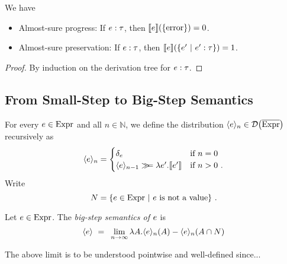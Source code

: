 %
%
\begin{theorem}
	\label{thm:small-step-progress-preservation} We have 
	\begin{itemize}
		\item Almost-sure progress: If $e : \tau$, then $\llbracket e \rrbracket(\{ \textnormal{error} \}) = 0$.
		\item Almost-sure preservation: If $e : \tau$, then $\llbracket e \rrbracket(\{ e' ~|~ e' : \tau \}) = 1$.
	\end{itemize}
	
\end{theorem}
%
\begin{proof}
	 By induction on the derivation tree for $e : \tau$.
\end{proof}

\subsection{From Small-Step to Big-Step Semantics}
%
%
%
For every $e \in \textnormal{Expr}$ and all $n \in \mathbb{N}$, we define the distribution $\langle e \rangle_{n} \in \mathcal{D} \big( {\overline{\textnormal{Expr}}} \big)$ recursively as
%
\[
	\langle e \rangle_{n} = 
	\begin{cases}
		\delta_e & \text{if $n=0$} \\
		\langle e \rangle_{n-1} \gg\!\!=  \lambda e'. \llbracket e' \rrbracket & \text{if $n>0$}~.
	\end{cases}
\]
%
Write 
%
\[
	N = \{e \in \textnormal{Expr} ~|~ e~\text{is not a value} \}~.
\]
\begin{definition}
	Let $e \in \textnormal{Expr}$. The \emph{big-step semantics of $e$} is 
	\[
		\langle e \rangle ~{}={}~ \lim_{n \to \infty} \lambda A.
		\langle e \rangle_{n}(A)  - \langle e \rangle_{n}(A \cap N)
	\]
\end{definition}
%
The above limit is to be understood pointwise and well-defined since...

